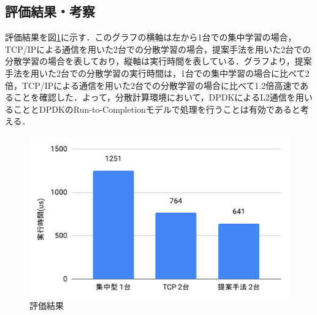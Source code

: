 \subsection{評価結果・考察}
評価結果を図\ref{fig:EvaluationResult}に示す．このグラフの横軸は左から1台での集中学習の場合，TCP/IPによる通信を用いた2台での分散学習の場合，提案手法を用いた2台での分散学習の場合を表しており，縦軸は実行時間を表している．グラフより，提案手法を用いた2台での分散学習の実行時間は，1台での集中学習の場合に比べて2倍，TCP/IPによる通信を用いた2台での分散学習の場合に比べて1.2倍高速であることを確認した．よって，分散計算環境において，DPDKによるL2通信を用いることとDPDKのRun-to-Completionモデルで処理を行うことは有効であると考える．

\begin{figure}[htb]
  \centering
  \includegraphics[width=\columnwidth]{pictures/EvaluationResult.pdf}
  \caption{評価結果}
  \label{fig:EvaluationResult}
\end{figure}
